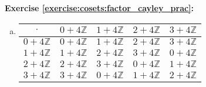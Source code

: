\noindent\textbf{Exercise \ref{exercise:cosets:factor_cayley_prac}:}
\begin{enumerate}[(a)]
\item
\begin{center}
\begin{tabular}{c|cccc}
$\cdot$             & $0 + 4{\mathbb Z}$ & $1 + 4{\mathbb Z}$ & $2 + 4{\mathbb Z}$ & $3 + 4{\mathbb Z}$ \\\hline
$0 + 4{\mathbb Z}$ & $0 + 4{\mathbb Z}$ & $1 + 4{\mathbb Z}$ & $2 + 4{\mathbb Z}$ & $3 + 4{\mathbb Z}$\\
$1 + 4{\mathbb Z}$ & $1 + 4{\mathbb Z}$ & $2 + 4{\mathbb Z}$ & $3 + 4{\mathbb Z}$ & $0 + 4{\mathbb Z}$\\
$2 + 4{\mathbb Z}$ & $2 + 4{\mathbb Z}$ & $3 + 4{\mathbb Z}$ & $0 + 4{\mathbb Z}$ & $1 + 4{\mathbb Z}$\\
$3 + 4{\mathbb Z}$ & $3 + 4{\mathbb Z}$ & $0 + 4{\mathbb Z}$ & $1 + 4{\mathbb Z}$ & $2 + 4{\mathbb Z}$\\
\end{tabular}
\end{center}

 

\end{enumerate}
